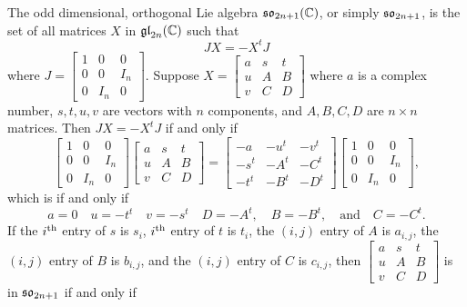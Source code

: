 The odd dimensional, orthogonal Lie algebra $\mathfrak {so}_{2n+1}({\mathbb C})$, or simply
$\mathfrak {so}_{2n+1}$, is the set of all matrices $X$ in $\mathfrak {gl}_{2n}({\mathbb C})$ such that
\[
JX= -X^t J
\]
where $J= \left[\begin{smallmatrix} 1&0&0\\ 0 &0&I_n\\ 0&I_n
    &0\end{smallmatrix} \right]$.  Suppose $X=\left[\begin{smallmatrix}
    a&s&t\\ u&A&B\\ v&C& D \end{smallmatrix} \right]$ where $a$ is a complex
number, $s,t,u,v$ are vectors with $n$ components, and $A, B, C, D$ are
$n\times n$ matrices. Then $JX= -X^t J$ if and only if
\[
\begin{bmatrix}
  1&0&0\\ 0&0&I_n\\ 0&I_n& 0
\end{bmatrix}
\begin{bmatrix}
  a&s&t\\ u&A&B\\ v&C& D
\end{bmatrix}
=
\begin{bmatrix}
  -a&-u^t&-v^t\\-s^t&-A^t&-C^t\\ -t^t&-B^t&-D^t
\end{bmatrix}
\begin{bmatrix}
  1&0&0\\ 0&0&I_n\\ 0&I_n& 0
\end{bmatrix},
\]
which is if and only if
\[
a=0\quad u=-t^t \quad v=-s^t\quad D=-A^t,\quad B=-B^t,\quad\text{and} \quad
C=-C^t.
\]
If the $i{^{\text{th}}}$ entry of $s$ is $s_i$, $i{^{\text{th}}}$ entry of $t$ is $t_i$, the
$(i,j)$ entry of $A$ is $a_{i,j}$, the $(i,j)$ entry of $B$ is $b_{i,j}$,
and the $(i,j)$ entry of $C$ is $c_{i,j}$, then $\left[\begin{smallmatrix}
    a&s&t\\ u&A&B\\ v&C& D \end{smallmatrix} \right]$ is in $\mathfrak {so}_{2n+1}$ if
and only if
